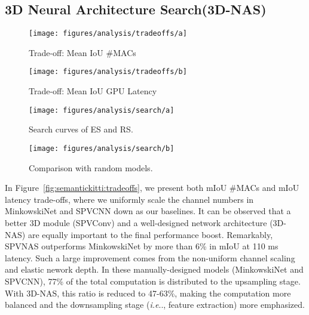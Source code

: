 \documentclass[runningheads]{llncs}
\makeatletter
\newcommand{\fig}[1]{Figure~\ref{#1}}
\DeclareRobustCommand\onedot{\futurelet\@let@token\@onedot}
\def\@onedot{\ifx\@let@token.\else.\null\fi\xspace}
\def\ie{\emph{i.e}\onedot} \def\Ie{\emph{I.e}\onedot}
\def\moduleshort{SPVConv\xspace}
\def\cnnshort{SPVCNN\xspace}
\def\modelshort{SPVNAS\xspace}
\def\nas{3D Neural Architecture Search\xspace}
\def\nasshort{3D-NAS\xspace}
\makeatother
\begin{document}
\subsection{\nas (\nasshort)}

\begin{figure*}[t]
\begin{subfigure}[t]{0.49\linewidth}
    \centering
    \texttt{[image: figures/analysis/tradeoffs/a]}
    \caption{Trade-off: Mean IoU \vs \#MACs}
\end{subfigure}
\begin{subfigure}[t]{0.495\linewidth}
    \centering
    \texttt{[image: figures/analysis/tradeoffs/b]}
    \caption{Trade-off: Mean IoU \vs GPU Latency}
\end{subfigure}
\caption{An efficient 3D module (\moduleshort) and a well-designed network architecture (\nasshort) are equally important to the final performance of \modelshort: \textbf{7.6}$\times$ computation reduction and \textbf{2.7}$\times$ measured speedup over MinkowskiNet.}
\label{fig:semantickitti:tradeoffs}
\end{figure*} \begin{figure*}[t]
\centering
\begin{subfigure}[t]{0.49\linewidth}
    \centering
    \texttt{[image: figures/analysis/search/a]}
    \caption{Search curves of ES and RS.}
    \label{fig:analysis:search:a}
\end{subfigure}
\begin{subfigure}[t]{0.49\linewidth}
    \centering
    \texttt{[image: figures/analysis/search/b]}
    \caption{Comparison with random models.}
    \label{fig:analysis:search:b}
\end{subfigure}
\caption{Evolutionary Search (ES) is more sample-efficient than Random Search (RS).}
\label{fig:analysis:search}
\end{figure*}
 
In \fig{fig:semantickitti:tradeoffs}, we present both mIoU \vs \#MACs and mIoU \vs latency trade-offs, where we uniformly scale the channel numbers in MinkowskiNet and \cnnshort down as our baselines. It can be observed that a better 3D module (\moduleshort) and a well-designed network architecture (\nasshort) are equally important to the final performance boost. Remarkably, \modelshort outperforms MinkowskiNet by more than 6\% in mIoU at 110 ms latency. Such a large improvement comes from the non-uniform channel scaling and elastic nework depth. In these manually-designed models (MinkowskiNet and \cnnshort), 77\% of the total computation is distributed to the upsampling stage. With \nasshort, this ratio is reduced to 47-63\%, making the computation more balanced and the downsampling stage (\ie, feature extraction) more emphasized.
\end{document}
